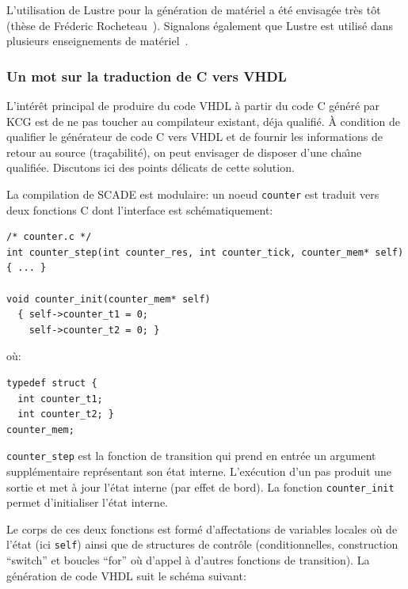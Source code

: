 \documentclass[a4paper]{article}
\newcommand{\lustre}{{\sc Lustre}}
\begin{document}
L'utilisation de Lustre pour la g\'en\'eration de mat\'eriel a \'et\'e envisag\'ee
tr\`es t\^ot (th\`ese de Fr\'ederic Rocheteau~\cite{lustre:rocheteau91}). Signalons
\'egalement que \lustre{} est utilis\'e dans plusieurs enseignements de
mat\'eriel~\cite{lustre:amblard05}.

\subsubsection{Un mot sur la traduction de C vers VHDL}
L'int\'er\^et principal de produire du code VHDL \`a partir du code C g\'en\'er\'e par KCG est
de ne pas toucher au compilateur existant, d\'eja qualifi\'e. \`A condition
de qualifier le g\'en\'erateur de code C vers VHDL et de fournir les
informations de retour au source (tra\c{c}abilit\'e), on peut envisager de disposer 
d'une cha\^{\i}ne qualifi\'ee. Discutons ici des points d\'elicats de cette solution.

La compilation de SCADE est modulaire: un noeud \texttt{counter}
est traduit vers deux fonctions
C dont l'interface est sch\'ematiquement:

\begin{verbatim}
/* counter.c */
int counter_step(int counter_res, int counter_tick, counter_mem* self) { ... }

void counter_init(counter_mem* self)
  { self->counter_t1 = 0;
    self->counter_t2 = 0; }
\end{verbatim}
o\`u:
\begin{verbatim}
typedef struct { 
  int counter_t1; 
  int counter_t2; }
counter_mem;
\end{verbatim}
\texttt{counter\_step} est la fonction de transition qui prend
en entr\'ee un argument suppl\'ementaire repr\'esentant son \'etat interne. L'ex\'ecution
d'un pas produit une sortie et met \`a jour l'\'etat interne (par effet de bord).
La fonction \texttt{counter\_init} permet d'initialiser l'\'etat interne.

Le corps de ces deux fonctions est form\'e d'affectations de variables
locales o\`u de l'\'etat (ici \texttt{self}) ainsi que de structures de
contr\^ole (conditionnelles, construction ``switch'' et boucles ``for''
o\`u d'appel \`a d'autres fonctions de transition). La g\'en\'eration de code
VHDL suit le sch\'ema suivant:
\end{document}
